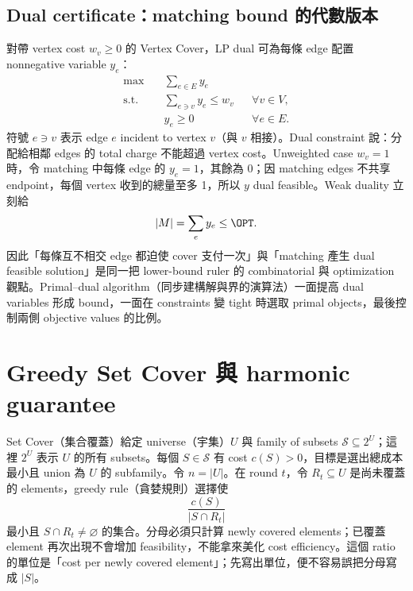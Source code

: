 \documentclass[11pt,a4paper,oneside,openany]{book}
\begin{document}
\subsection{Dual certificate：matching bound 的代數版本}
對帶 vertex cost $w_v\ge0$ 的 Vertex Cover，LP dual 可為每條 edge 配置 nonnegative variable $y_e$：
\begin{align*}
\max\quad&\sum_{e\in E}y_e\\
\text{s.t.}\quad&\sum_{e\ni v}y_e\le w_v &&\forall v\in V,\\
&y_e\ge0 &&\forall e\in E.
\end{align*}
符號 $e\ni v$ 表示 edge $e$ incident to vertex $v$（與 $v$ 相接）。Dual constraint 說：分配給相鄰 edges 的 total charge 不能超過 vertex cost。Unweighted case $w_v=1$ 時，令 matching 中每條 edge 的 $y_e=1$，其餘為 0；因 matching edges 不共享 endpoint，每個 vertex 收到的總量至多 1，所以 $y$ dual feasible。Weak duality 立刻給
\[
 |M|=\sum_e y_e\le\OPT.
\]
因此「每條互不相交 edge 都迫使 cover 支付一次」與「matching 產生 dual feasible solution」是同一把 lower-bound ruler 的 combinatorial 與 optimization 觀點。Primal--dual algorithm（同步建構解與界的演算法）一面提高 dual variables 形成 bound，一面在 constraints 變 tight 時選取 primal objects，最後控制兩側 objective values 的比例。

\section{Greedy Set Cover 與 harmonic guarantee}
Set Cover（集合覆蓋）給定 universe（宇集）$U$ 與 family of subsets $\mathcal S\subseteq2^U$；這裡 $2^U$ 表示 $U$ 的所有 subsets。每個 $S\in\mathcal S$ 有 cost $c(S)>0$，目標是選出總成本最小且 union 為 $U$ 的 subfamily。令 $n=|U|$。在 round $t$，令 $R_t\subseteq U$ 是尚未覆蓋的 elements，greedy rule（貪婪規則）選擇使
\[
 \frac{c(S)}{|S\cap R_t|}
\]
最小且 $S\cap R_t\ne\varnothing$ 的集合。分母必須只計算 newly covered elements；已覆蓋 element 再次出現不會增加 feasibility，不能拿來美化 cost efficiency。這個 ratio 的單位是「cost per newly covered element」；先寫出單位，便不容易誤把分母寫成 $|S|$。
\end{document}
